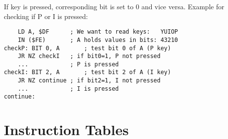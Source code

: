 \documentclass[twoside,openright,a4paper]{book}
\begin{document}
If key is pressed, corresponding bit is set to 0 and vice versa. Example for checking if P or I is pressed:

\begin{Verbatim}
	LD A, $DF      ; We want to read keys:   YUIOP
	IN ($FE)       ; A holds values in bits: 43210
checkP: BIT 0, A       ; test bit 0 of A (P key)
	JR NZ checkI   ; if bit0=1, P not pressed
	...            ; P is pressed
checkI: BIT 2, A       ; test bit 2 of A (I key)
	JR NZ continue ; if bit2=1, I not pressed
	...            ; I is pressed
continue:
\end{Verbatim}




\chapter{Instruction Tables}

\minitoc

\newcommand{\instrtable}[1]{
	{
		\tt
		\small 
		\setlength{\fboxsep}{0.25mm}
		\setlength{\tabcolsep}{1mm}
		
		\begin{tabular}{llcccccccccccccccl}

			\hline
			
			& 
			Symbolic &
			\multicolumn{8}{c}{Flags} & 
			\multicolumn{3}{c}{Opcode} &
			& & 
			& & \\

			Mnemonic & 
			Operation &
			SF & ZF & YF & HF & XF & PF & NF & CF &
			76 & 543 & 210 & 
			Hex & B & 
			Mc & Ts & 
			Comments \\

			\hline

			#1

		\end{tabular}
	}
}

\newcommand{\instrempty}[1]{
	\multicolumn{17}{l}{} & #1 \\
}

\newcommand{\instrnotetitle}{
	\scriptsize
	Notes:
}

\newcommand{\instrnoteitem}[1]{
	\multicolumn{17}{l}{\scriptsize\parbox{12cm}{#1}}
}

\newcommand{\instrtablelebreak}{
	(continued)
	\pagebreak
}
\end{document}

